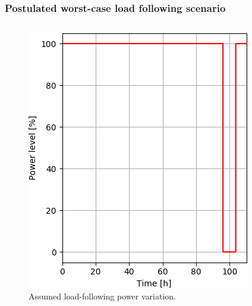 \begin{frame}
\frametitle{Postulated worst-case load following scenario}
\vspace{-6mm}
\begin{columns}
	\column[t]{5.5cm}
	\begin{figure}[t]
		\includegraphics[width=\linewidth]{./images/power_load_curve.png}
		\vspace{-6mm}
		\caption{Assumed load-following power variation.}
	\end{figure}
	

\end{columns}
\end{frame}

